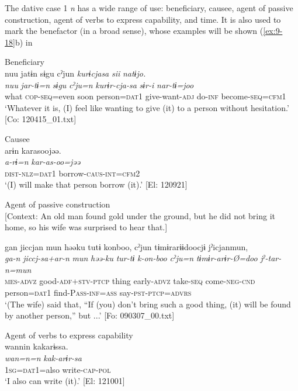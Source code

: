 The dative case 1 \textit{n} has a wide range of use: beneficiary, causee, agent of passive construction, agent of verbs to express capability, and time. It is also used to mark the benefactor (in a broad sense), whose examples will be shown (\ref{ex:9-18}b) in 

\ea\label{ex:6-55}
\ea Beneficiary\\
{\TM}
\glll  nuu  jatɨn  sɨgu  cˀjun  \textit{kurɨcjasa}  \textit{sii}  \textit{natɨjo.}\\
\textit{nuu}  \textit{jar-tɨ=n}  \textit{sɨgu}  \textit{cˀju=n}  \textit{kurɨr-cja-sa}      \textit{sɨr-i}  \textit{nar-tɨ=joo}\\
what  \textsc{cop}-\textsc{seq}=even  soon  person=\textsc{dat}1  give-want-\textsc{adj}   do-\textsc{inf}  become-\textsc{seq}=\textsc{cfm}1\\
\glt ‘Whatever it is, (I) feel like wanting to give (it) to a person without hesitation.’ [Co: 120415\_01.txt]

\ex Causee\\
{\TM}
\glll  arɨn  karasoojəə.\\
\textit{a-rɨ=n}  \textit{kar-as-oo=jəə}\\
\textsc{dist}-\textsc{nlz}=\textsc{dat}1  borrow-\textsc{caus}-\textsc{int}=\textsc{cfm}2\\
\glt ‘(I) will make that person borrow (it).’ [El: 120921]

\ex Agent of passive construction\\{}
[Context: An old man found gold under the ground, but he did not bring it home, so his wife was surprised to hear that.]

{\TM}
\glll gan  jiccjan  mun  həəku  tutɨ   konboo,  cˀjun  tɨmɨrarɨɨdoocjɨ  jˀicjanmun,\\
      \textit{ga-n}  \textit{jiccj-sa+ar-n}  \textit{mun}  \textit{həə-ku}  \textit{tur-tɨ}  \textit{k-on-boo}  \textit{cˀju=n}  \textit{tɨmɨr-arɨr-Ø=doo}  \textit{jˀ-tar-n=mun}\\
      \textsc{mes}-\textsc{advz}  good-\textsc{adf}+\textsc{stv}-\textsc{ptcp}  thing  early-\textsc{advz}  take-\textsc{seq} come-\textsc{neg}-\textsc{cnd}  person=\textsc{dat}1  find-P\textsc{ass}-\textsc{inf}=\textsc{ass}  say-\textsc{pst}-\textsc{ptcp}=\textsc{advrs}\\
\glt ‘(The wife) said that, “If (you) don’t bring such a good thing, (it) will be found by another person,” but ...’ [Fo: 090307\_00.txt]

\ex Agent of verbs to express capability\\
{\TM}
\glll  wannin  kakarɨssa.\\
\textit{wan=n=n}  \textit{kak-arɨr-sa}\\
1\textsc{sg}=\textsc{dat}1=also  write-\textsc{cap}-\textsc{pol}\\
\glt ‘I also can write (it).’ [El: 121001]

